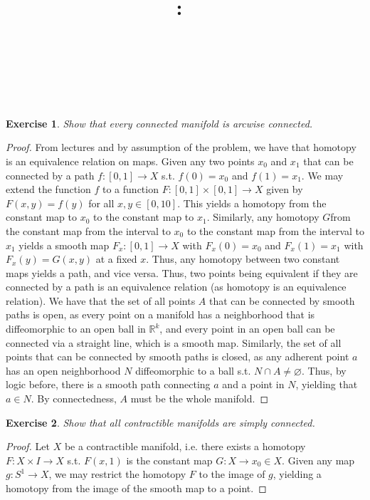 \documentclass{article}
\title{
    \vspace{2in}
    \textmd{\textbf{\hmwkClass:\ \hmwkTitle}}\\
    \vspace{0.1in}
    \textmd{\hmwkDueDate} \\
    \vspace{0.2in}\large{\textit{\hmwkClassInstructor\  }}
    \vspace{2in}
}
\author{\hmwkAuthorName}
\date{}
\newtheorem{exercise}{Exercise}
\begin{document}
\maketitle

\pagebreak

\begin{exercise}
Show that every connected manifold is arcwise connected.
  \end{exercise}

  \begin{proof}
    From lectures and by assumption of the problem, we have that homotopy is an equivalence relation on maps. Given any two points $x_{0}$ and $x_{1}$ that can be connected by a path $f: [0,1] \to X$ s.t. $f(0) = x_{0}$ and $f(1) = x_{1}$. We may extend the function $f$ to a function $F:[0,1] \times [0,1] \to X$ given by $F(x,y) = f(y)$ for all $x,y \in [0,10]$. This yields a homotopy from the constant map to $x_{0}$ to the constant map to $x_{1}$. Similarly, any homotopy $G$from the constant map from the interval to $x_{0}$ to the constant map from the interval to $x_{1}$ yields a smooth map $F_{x}: [0,1] \to X$ with $F_{x}(0) = x_{0}$ and $F_{x}(1) = x_{1}$ with $F_{x} (y) = G(x,y)$ at a fixed $x$. Thus, any homotopy between two constant maps yields a path, and vice versa. Thus, two points being equivalent if they are connected by a path is an equivalence relation (as homotopy is an equivalence relation). We have that the set of all points $A$ that can be connected by smooth paths is open, as every point on a manifold has a neighborhood that is diffeomorphic to an open ball in $\mathbb{R}^{k}$, and every point in an open ball can be connected via a straight line, which is a smooth map. Similarly, the set of all points that can be connected by smooth paths is closed, as any adherent point $a$ has an open neighborhood $N$ diffeomorphic to a ball s.t. $N \cap A \neq \varnothing$. Thus, by logic before, there is a smooth path connecting $a$ and a point in $N$, yielding that $a \in N$. By connectedness, $A$ must be the whole manifold. 
    \end{proof}

    \begin{exercise}
      Show that all contractible manifolds are simply connected.
      \end{exercise}

      \begin{proof}
        Let $X$ be a contractible manifold, i.e. there exists a homotopy $F:X \times I \to X$ s.t. $F(x,1)$ is the constant map $G:X \to {x_{0}} \in X$. Given any map $g: S^{1} \to X$, we may restrict the homotopy $F$ to the image of $g$, yielding a homotopy from the image of the smooth map to a point.  
        \end{proof}
\end{document}
